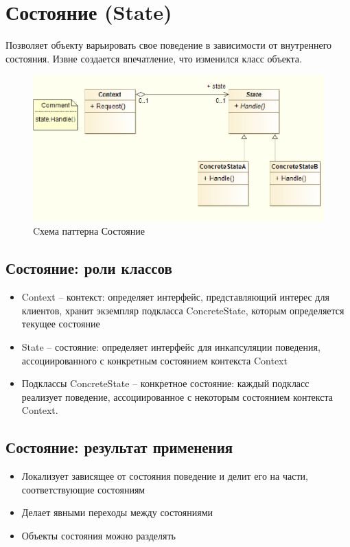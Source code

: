 \section{Состояние (State)}
Позволяет объекту варьировать свое поведение в зависимости от внутреннего
состояния. Извне создается впечатление, что изменился класс объекта.
\begin{figure}[!ht]
\begin{center}
\includegraphics[scale=0.7]{images/pic/pic28-3.png}\caption{Cхема паттерна Состояние}\label{figure1}
\end{center}
\end{figure}
\subsection{Состояние: роли классов}
\begin{itemize}
    \item Context – контекст: определяет интерфейс, представляющий интерес для клиентов, хранит экземпляр подкласса ConcreteState, которым определяется текущее состояние
     \item State – состояние: определяет интерфейс для инкапсуляции поведения, ассоциированного с конкретным состоянием контекста Context
     \item Подклассы ConcreteState – конкретное состояние: каждый подкласс реализует поведение, ассоциированное с некоторым состоянием контекста Context.
\end{itemize}
\subsection{Состояние: результат применения}
\begin{itemize}
    \item Локализует зависящее от состояния поведение и делит его на части, соответствующие состояниям
    \item Делает явными переходы между состояниями
    \item Объекты состояния можно разделять
\end{itemize}

